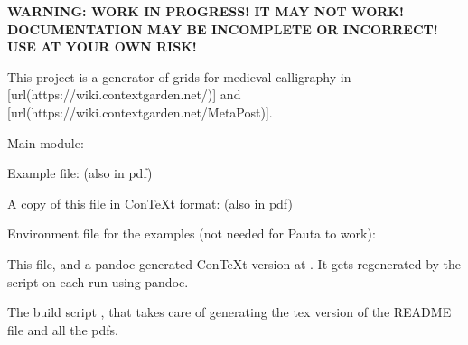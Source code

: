 \startchapter[title={A Calligraphy Grid in ConTeXt/LMTX},reference={a-calligraphy-grid-in-contextlmtx}]

{\bf WARNING: WORK IN PROGRESS! IT MAY NOT WORK! DOCUMENTATION MAY BE INCOMPLETE OR INCORRECT! USE AT YOUR OWN RISK!}

This project is a generator of grids for medieval calligraphy in [url(https://wiki.contextgarden.net/)] and [url(https://wiki.contextgarden.net/MetaPost)].

\startsection[title={Files included},reference={files-included}]

\startitemize[packed]
\item
  Main module: 
\item
  Example file:  (also in pdf)
\item
  A copy of this file in ConTeXt format:  (also in pdf)
\item
  Environment file for the examples (not needed for Pauta to work): 
\item
  This  file, and a pandoc generated ConTeXt version at . It gets regenerated by the  script on each run using pandoc.
\item
  The build script , that takes care of generating the tex version of the README file and all the pdfs.
\stopitemize

\stopsection

\startsection[title={Use},reference={use}]

